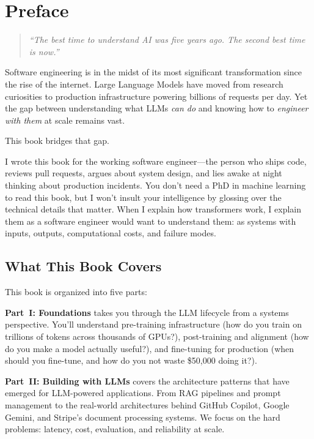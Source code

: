\chapter*{Preface}

\begin{quote}
\itshape
``The best time to understand AI was five years ago. The second best time is now.''
\end{quote}

\vspace{0.5cm}

\noindent
Software engineering is in the midst of its most significant transformation since the rise of the internet. Large Language Models have moved from research curiosities to production infrastructure powering billions of requests per day. Yet the gap between understanding what LLMs \emph{can do} and knowing how to \emph{engineer with them} at scale remains vast.

This book bridges that gap.

I wrote this book for the working software engineer---the person who ships code, reviews pull requests, argues about system design, and lies awake at night thinking about production incidents. You don't need a PhD in machine learning to read this book, but I won't insult your intelligence by glossing over the technical details that matter. When I explain how transformers work, I explain them as a software engineer would want to understand them: as systems with inputs, outputs, computational costs, and failure modes.

\section*{What This Book Covers}

This book is organized into five parts:

\textbf{Part~I: Foundations} takes you through the LLM lifecycle from a systems perspective. You'll understand pre-training infrastructure (how do you train on trillions of tokens across thousands of GPUs?), post-training and alignment (how do you make a model actually useful?), and fine-tuning for production (when should you fine-tune, and how do you not waste \$50,000 doing it?).

\textbf{Part~II: Building with LLMs} covers the architecture patterns that have emerged for LLM-powered applications. From RAG pipelines and prompt management to the real-world architectures behind GitHub Copilot, Google Gemini, and Stripe's document processing systems. We focus on the hard problems: latency, cost, evaluation, and reliability at scale.

